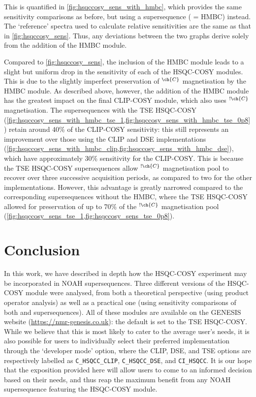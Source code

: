 \documentclass[a4paper,12pt]{article}
\newcommand{\magn}[1]{\ch{^1H}$^{\ch{#1}}$}
\newcommand{\magnnot}[1]{\ch{^1H}$^{!\ch{#1}}$}
\begin{document}
\begin{refsection}
This is quantified in \cref{fig:hsqccosy_sens_with_hmbc}, which provides the same sensitivity comparisons as before, but using a  supersequence ( = HMBC) instead.
The `reference' spectra used to calculate relative sensitivities are the same as that in \cref{fig:hsqccosy_sens}.
Thus, any deviations between the two graphs derive solely from the addition of the HMBC module.

Compared to \cref{fig:hsqccosy_sens}, the inclusion of the HMBC module leads to a slight but uniform drop in the sensitivity of each of the HSQC-COSY modules.
This is due to the slightly imperfect preservation of \magn{C} magnetisation by the HMBC module.
As described above, however, the addition of the HMBC module has the greatest impact on the final CLIP-COSY module, which also uses \magnnot{C} magnetisation.
The supersequences with the TSE HSQC-COSY (\cref{fig:hsqccosy_sens_with_hmbc_tse_1,fig:hsqccosy_sens_with_hmbc_tse_0p8}) retain around 40\% of the CLIP-COSY sensitivity: this still represents an improvement over those using the CLIP and DSE implementations (\cref{fig:hsqccosy_sens_with_hmbc_clip,fig:hsqccosy_sens_with_hmbc_dse}), which have approximately 30\% sensitivity for the CLIP-COSY.
This is because the TSE HSQC-COSY supersequences allow \magnnot{C} magnetisation pool to recover over three successive acquisition periods, as compared to two for the other implementations.
However, this advantage is greatly narrowed compared to the corresponding supersequences without the HMBC, where the TSE HSQC-COSY allowed for preservation of up to 70\% of the \magnnot{C} magnetisation pool (\cref{fig:hsqccosy_sens_tse_1,fig:hsqccosy_sens_tse_0p8}).

\section{Conclusion}

In this work, we have described in depth how the HSQC-COSY experiment may be incorporated in NOAH supersequences.
Three different versions of the HSQC-COSY module were analysed, from both a theoretical perspective (using product operator analysis) as well as a practical one (using sensitivity comparisons of both  and  supersequences).
All of these modules are available on the GENESIS website (\url{https://nmr-genesis.co.uk}): the default is set to the TSE HSQC-COSY.
While we believe that this is most likely to cater to the average user's needs, it is also possible for users to individually select their preferred implementation through the `developer mode' option, where the CLIP, DSE, and TSE options are respectively labelled as \texttt{C\_HSQCC\_CLIP}, \texttt{C\_HSQCC\_DSE}, and \texttt{CI\_HSQCC}.
It is our hope that the exposition provided here will allow users to come to an informed decision based on their needs, and thus reap the maximum benefit from any NOAH supersequence featuring the HSQC-COSY module.


\end{refsection}
\end{document}
